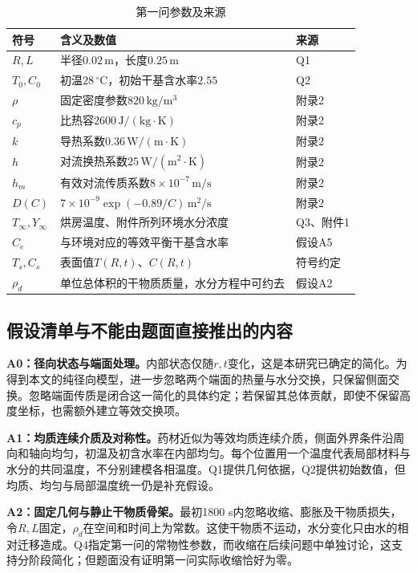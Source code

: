 \documentclass[UTF8,a4paper,zihao=-4,fontset=none]{ctexart}
\numberwithin{equation}{section}
\newcommand{\units}[1]{\,\mathrm{#1}}
\begin{document}
\begin{table}[htbp]
\centering
\caption{第一问参数及来源}\label{tab:params}
\small
\begin{tabularx}{\textwidth}{@{}l Y l@{}}
\toprule
符号 & 含义及数值 & 来源\\
\midrule
$R,L$ & 半径$0.02\units m$，长度$0.25\units m$ & Q1\\
$T_0,C_0$ & 初温$28\,^\circ\mathrm C$，初始干基含水率$2.55$ & Q2\\
$\rho$ & 固定密度参数$820\units{kg/m^3}$ & 附录2\\
$c_p$ & 比热容$2600\units{J/(kg\cdot K)}$ & 附录2\\
$k$ & 导热系数$0.36\units{W/(m\cdot K)}$ & 附录2\\
$h$ & 对流换热系数$25\units{W/(m^2\cdot K)}$ & 附录2\\
$h_m$ & 有效对流传质系数$8\times10^{-7}\units{m/s}$ & 附录2\\
$D(C)$ & $7\times10^{-9}\exp(-0.89/C)\units{m^2/s}$ & 附录2\\
$T_\infty,Y_\infty$ & 烘房温度、附件所列环境水分浓度 & Q3、附件1\\
$C_e$ & 与环境对应的等效平衡干基含水率 & 假设A5\\
$T_s,C_s$ & 表面值$T(R,t)$、$C(R,t)$ & 符号约定\\
$\rho_d$ & 单位总体积的干物质质量，水分方程中可约去 & 假设A2\\
\bottomrule
\end{tabularx}
\end{table}

\subsection{假设清单与不能由题面直接推出的内容}
\textbf{A0：径向状态与端面处理。}内部状态仅随$r,t$变化，这是本研究已确定的简化。为得到本文的纯径向模型，进一步忽略两个端面的热量与水分交换，只保留侧面交换。忽略端面传质是闭合这一简化的具体约定；若保留其总体贡献，即使不保留高度坐标，也需额外建立等效交换项。

\textbf{A1：均质连续介质及对称性。}药材近似为等效均质连续介质，侧面外界条件沿周向和轴向均匀，初温及初含水率在内部均匀。每个位置用一个温度代表局部材料与水分的共同温度，不分别建模各相温度。Q1提供几何依据，Q2提供初始数值，但均质、均匀与局部温度统一仍是补充假设。

\textbf{A2：固定几何与静止干物质骨架。}最初1800 s内忽略收缩、膨胀及干物质损失，令$R,L$固定，$\rho_d$在空间和时间上为常数。这使干物质不运动，水分变化只由水的相对迁移造成。Q4指定第一问的常物性参数，而收缩在后续问题中单独讨论，这支持分阶段简化；但题面没有证明第一问实际收缩恰好为零。
\end{document}
